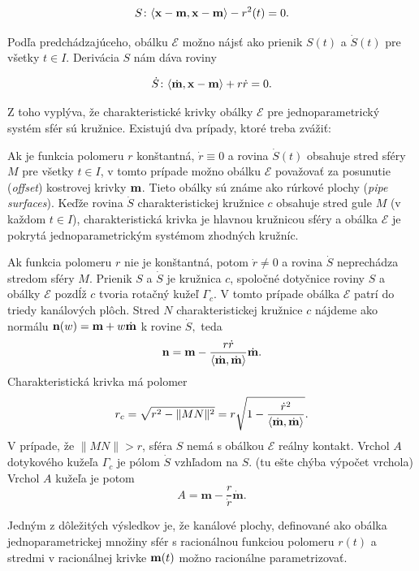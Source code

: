 $$
S \colon \langle \bold{x} - \bold{m}, \bold{x} - \bold{m} \rangle - r^2(t)= 0.
$$

Podľa predchádzajúceho, obálku $\mathcal{E}$ možno nájsť ako prienik $S(t)$ a $\dot{S}(t)$ pre všetky $t \in I$. Derivácia $S$ nám dáva roviny

$$
\dot{S} \colon \langle \dot{\bold{m}}, \bold{x} - \bold{m} \rangle + r \dot{r} = 0.
$$

Z toho vyplýva, že charakteristické krivky obálky $\mathcal{E}$ pre jednoparametrický systém sfér sú kružnice. Existujú dva prípady, ktoré treba zvážiť:

Ak je funkcia polomeru $r$ konštantná, $\dot{r} \equiv 0$ a rovina $\dot{S}(t)$ obsahuje stred sféry $M$ pre všetky $t \in I$, v tomto prípade možno obálku $\mathcal{E}$ považovať za posunutie (\textit{offset}) kostrovej krivky $\bold{m}$. Tieto obálky sú známe ako rúrkové plochy (\textit{pipe surfaces}). Keďže rovina $\dot{S}$ charakteristickej kružnice $c$ obsahuje stred gule $M$ (v každom $t \in I$), charakteristická krivka je hlavnou kružnicou sféry a obálka $\mathcal{E}$ je pokrytá jednoparametrickým systémom zhodných kružníc.

Ak funkcia polomeru $r$ nie je konštantná, potom $\dot{r} \neq 0$ a rovina $\dot{S}$  neprechádza stredom sféry $M$. Prienik $S$ a $\dot{S}$ je kružnica $c$, spoločné dotyčnice roviny $S$ a obálky $\mathcal{E}$ pozdĺž $c$ tvoria rotačný kužeľ $\Gamma_{c}$. V tomto prípade obálka $\mathcal{E}$ patrí do triedy kanálových plôch. 
Stred $N$ charakteristickej kružnice $c$ nájdeme ako normálu $\bold{n}(w) = \bold{m} + w\dot{\bold{m}}$ k rovine $\dot{S},$  
teda
$$ \bold{n} = \bold{m} - \frac{r \dot{r}}{\langle \dot{\bold{m}}, \dot{\bold{m}} \rangle} \dot{\bold{m}}.$$
Charakteristická krivka má polomer
$$ r_c = \sqrt{r^2 - \|MN\|^2} = r \sqrt{ 1 - \frac{\dot{r}^2}{\langle \dot{\bold{m}}, \dot{\bold{m}} \rangle}}. $$
V prípade, že $ \|MN\| > r$, sféra $S$ nemá s obálkou $\mathcal{E}$ reálny kontakt. Vrchol $A$ dotykového kužeľa $\Gamma_c$ je pólom $\dot{S}$ vzhľadom na $S$. (tu ešte chýba výpočet vrchola)
Vrchol $A$ kužeľa je potom 
$$
A = \mathbf{m} - \frac{r} {\dot{r}}\mathbf{\dot{m}}.
$$

Jedným z dôležitých výsledkov je, že kanálové plochy, definované ako obálka jednoparametrickej množiny sfér s racionálnou funkciou polomeru $r(t)$ a stredmi v racionálnej krivke $\bold{m}(t)$ možno racionálne parametrizovať. \cite{Pet97}

